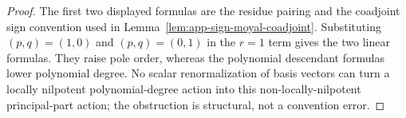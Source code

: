 \begin{proof}
  The first two displayed formulas are the residue pairing and the
  coadjoint sign convention used in
  Lemma~\ref{lem:app-sign-moyal-coadjoint}.  Substituting
  \((p,q)=(1,0)\) and \((p,q)=(0,1)\) in the \(r=1\) term gives the two
  linear formulas.  They raise pole order, whereas the polynomial
  descendant formulas lower polynomial degree.  No scalar renormalization of
  basis vectors can turn a locally nilpotent polynomial-degree action into
  this non-locally-nilpotent principal-part action; the obstruction is structural, not a
  convention error.
\end{proof}
